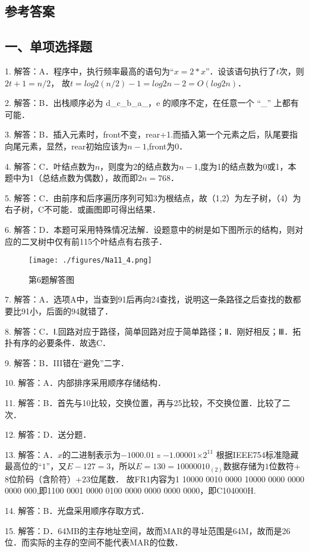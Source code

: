 \subsection{参考答案}
\subsection{一、单项选择题}
1. 解答：A．程序中，执行频率最高的语句为“$x=2*x$”．设该语句执行了$t$次，则$2t+1=n/2$， 故$t=log2(n/2)-1=log2n-2= O(log2n)$．

2. 解答：B．出栈顺序必为 d\_c\_b\_a\_，e 的顺序不定，在任意一个 “\_” 上都有可能．

3. 解答：B．插入元素时，front不变，rear+1.而插入第一个元素之后，队尾要指向尾元素，显然，rear初始应该为$n-1$,front为$0$．

4. 解答：C．叶结点数为$n$，则度为2的结点数为$n-1$,度为1的结点数为0或1，本题中为1（总结点数为偶数），故而即$2n=768$．

5. 解答：C．由前序和后序遍历序列可知3为根结点，故（1,2）为左子树，（4）为右子树，C不可能．或画图即可得出结果．

6. 解答：D．本题可采用特殊情况法解．设题意中的树是如下图所示的结构，则对应的二叉树中仅有前115个叶结点有右孩子．\\
\begin{figure}[ht]
\centering
\texttt{[image: ./figures/Na11\_4.png]}
\caption{第6题解答图} \label{Na11_fig4}
\end{figure}

7. 解答：A．选项A中，当查到91后再向24查找，说明这一条路径之后查找的数都要比91小，后面的94就错了．

8. 解答：C．Ⅰ.回路对应于路径，简单回路对应于简单路径；Ⅱ．刚好相反；Ⅲ．拓扑有序的必要条件．故选C．

9. 解答：B．III错在“避免”二字．

10. 解答：A．内部排序采用顺序存储结构．

11. 解答：B．首先与10比较，交换位置，再与25比较，不交换位置．比较了二次．

12. 解答：D．送分题．

13. 解答：A．$x$的二进制表示为$-1000.01$﹦$-1.000 01$×$2^{11}$ 根据IEEE754标准隐藏最高位的“$1$”，又$E-127=3$，所以$E=130=1000 0010_{(2)}$数据存储为$1$位数符+$8$位阶码（含阶符）+$23$位尾数．
故FR1内容为1 10000 0010 0000 10000 0000 0000 0000 000,即1100 0001 0000 0100 0000 0000 0000 0000，即C104000H.

14. 解答：B．光盘采用顺序存取方式．

15. 解答：D．64MB的主存地址空间，故而MAR的寻址范围是64M，故而是26位．而实际的主存的空间不能代表MAR的位数．

